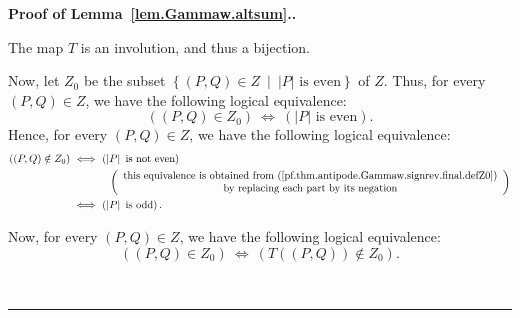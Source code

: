 \documentclass[numbers=enddot,12pt,final,onecolumn,notitlepage,abstracton]{scrartcl}
\theoremstyle{definition}
\newenvironment{proof}[1][Proof]{\noindent\textbf{#1.} }{\ \rule{0.5em}{0.5em}}
\newenvironment{verlong}{}{}
\begin{document}
\begin{proof}[Proof of Lemma~\ref{lem.Gammaw.altsum}.]
\begin{verlong}
{The map $T$ is an involution, and thus a bijection.

Now, let $Z_{0}$ be the subset $\left\{  \left(  P,Q\right)  \in
Z\ \mid\ \left\vert P\right\vert \text{ is even}\right\}  $ of $Z$. Thus, for
every $\left(  P,Q\right)  \in Z$, we have the following logical equivalence:%
\begin{equation}
\left(  \left(  P,Q\right)  \in Z_{0}\right)  \ \Longleftrightarrow\ \left(
\left\vert P\right\vert \text{ is even}\right)
.\label{pf.thm.antipode.Gammaw.signrev.final.defZ0}%
\end{equation}
Hence, for every $\left(  P,Q\right)  \in Z$, we have the following logical
equivalence:%
\begin{align}
\left(  \left(  P,Q\right)  \notin Z_{0}\right)  \   & \Longleftrightarrow
\ \left(  \left\vert P\right\vert \text{ is not even}\right)  \nonumber\\
& \ \ \ \ \ \ \ \ \ \ \left(
\begin{array}
[c]{c}%
\text{this equivalence is obtained from
(\ref{pf.thm.antipode.Gammaw.signrev.final.defZ0})}\\
\text{by replacing each part by its negation}%
\end{array}
\right)  \nonumber\\
& \Longleftrightarrow\ \left(  \left\vert P\right\vert \text{ is odd}\right)
.\label{pf.thm.antipode.Gammaw.signrev.final.defZ1}%
\end{align}


Now, for every $\left(  P,Q\right)  \in Z$, we have the following logical
equivalence:%
\begin{equation}
\left(  \left(  P,Q\right)  \in Z_{0}\right)  \ \Longleftrightarrow\ \left(
T\left(  \left(  P,Q\right)  \right)  \notin Z_{0}\right)
.\label{pf.thm.antipode.Gammaw.signrev.final.3}%
\end{equation}


}
\end{verlong}
\end{proof}
\end{document}
